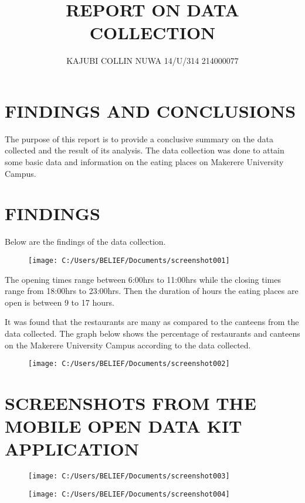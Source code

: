 \documentclass[]{report}
\title{REPORT ON DATA COLLECTION }
\author{KAJUBI COLLIN NUWA 14/U/314 214000077}
\begin{document}
\maketitle
\section*{FINDINGS AND CONCLUSIONS}
The purpose of this report is to provide a conclusive summary on the data collected and the result of its analysis. The data collection was done to attain some basic data and information on the eating places on Makerere University Campus. 

\section*{FINDINGS}

Below are the findings of the data collection.

\begin{figure}
	\centering
	\texttt{[image: C:/Users/BELIEF/Documents/screenshot001]}
	\caption{}
	\label{fig:screenshot001}
\end{figure}


The opening times range between 6:00hrs to 11:00hrs while the closing times range from 18:00hrs to 23:00hrs. Then the duration of hours the eating places are open is between 9 to 17 hours.

It was found that the restaurants are many as compared to the canteens from the data collected. The graph below shows the percentage of restaurants and canteens on the Makerere University Campus according to the data collected.

\begin{figure}
	\centering
	\texttt{[image: C:/Users/BELIEF/Documents/screenshot002]}
	\caption{}
	\label{fig:screenshot002}
\end{figure}

\section*{SCREENSHOTS FROM THE MOBILE OPEN DATA KIT APPLICATION}
\begin{figure}
	\centering
	\texttt{[image: C:/Users/BELIEF/Documents/screenshot003]}
	\caption{}
	\label{fig:screenshot003}
\end{figure}

\begin{figure}
	\centering
	\texttt{[image: C:/Users/BELIEF/Documents/screenshot004]}
	\caption{}
	\label{fig:screenshot004}
\end{figure}
\end{document}
